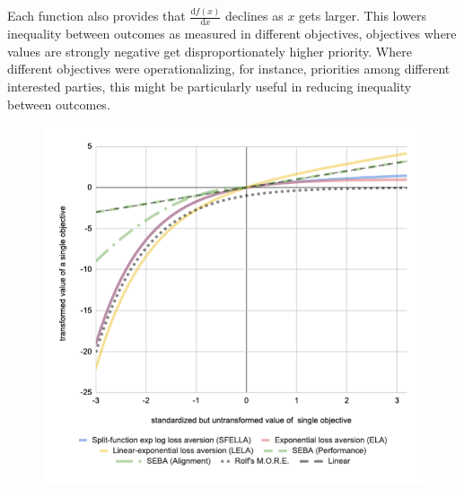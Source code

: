Each function also provides that $\frac{\mathrm{d} f(x) }{\mathrm{d} x}$ declines as $x$ gets larger. This lowers inequality between outcomes as measured in different objectives, objectives where values are strongly negative get disproportionately higher priority. Where different objectives were operationalizing, for instance, priorities among different interested parties, this might be particularly useful in reducing inequality between outcomes.



\begin{figure}[h]
 
  \includegraphics[width=\columnwidth]{output/transform_graph-2d_with_rolf2.png}%

\end{figure}
